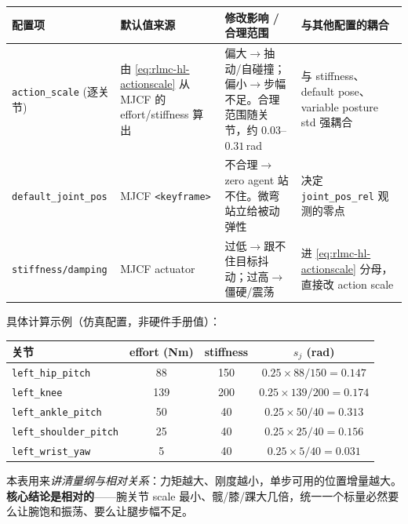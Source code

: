 \begin{center}
\small
\begin{tabular}{p{2.6cm}p{2.6cm}p{3.2cm}p{4.0cm}}
\hline
配置项 & 默认值来源 & 修改影响 / 合理范围 & 与其他配置的耦合 \\
\hline
\texttt{action\_scale} (逐关节) & 由 \eqref{eq:rlmc-hl-actionscale} 从 MJCF 的 effort/stiffness 算出 & 偏大$\to$抽动/自碰撞；偏小$\to$步幅不足。合理范围随关节，约 $0.03$--$0.31$\,rad & 与 stiffness、default pose、variable posture std 强耦合 \\
\texttt{default\_joint\_pos} & MJCF \texttt{<keyframe>} & 不合理$\to$zero agent 站不住。微弯站立给被动弹性 & 决定 \verb|joint_pos_rel| 观测的零点 \\
\texttt{stiffness/damping} & MJCF actuator & 过低$\to$跟不住目标抖动；过高$\to$僵硬/震荡 & 进 \eqref{eq:rlmc-hl-actionscale} 分母，直接改 action scale \\
\hline
\end{tabular}
\end{center}

具体计算示例（仿真配置，非硬件手册值）：

\begin{center}
\small
\begin{tabular}{lccc}
\hline
关节 & effort (Nm) & stiffness & $s_j$ (rad) \\
\hline
\texttt{left\_hip\_pitch} & 88 & 150 & $0.25\times88/150=0.147$ \\
\texttt{left\_knee} & 139 & 200 & $0.25\times139/200=0.174$ \\
\texttt{left\_ankle\_pitch} & 50 & 40 & $0.25\times50/40=0.313$ \\
\texttt{left\_shoulder\_pitch} & 25 & 40 & $0.25\times25/40=0.156$ \\
\texttt{left\_wrist\_yaw} & 5 & 40 & $0.25\times5/40=0.031$ \\
\hline
\end{tabular}
\end{center}

本表用来\emph{讲清量纲与相对关系}：力矩越大、刚度越小，单步可用的位置增量越大。\textbf{核心结论是相对的}——腕关节 scale 最小、髋/膝/踝大几倍，统一一个标量必然要么让腕饱和振荡、要么让腿步幅不足。


